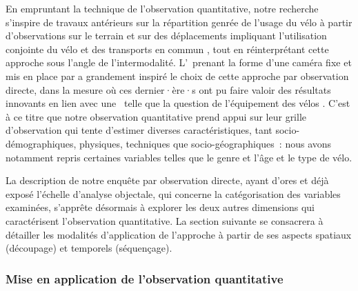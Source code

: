 \begin{refsegment}
En empruntant la technique de l’observation quantitative, notre recherche s'inspire de travaux antérieurs sur la répartition genrée de l'usage du vélo à partir d'observations sur le terrain \textcolor{blue}{\autocite[]{raibaud_femmes_2020}} et sur des déplacements impliquant l'utilisation conjointe du vélo et des transports en commun \textcolor{blue}{\autocites[192]{sherwin_practices_2011}[27]{la_paix_puello_modelling_2015}}, tout en réinterprétant cette approche sous l'angle de l'intermodalité. L'~prenant la forme d'une caméra fixe et mis en place par \textcolor{blue}{\textcite[99]{cochoy_mort_2013}} a grandement inspiré le choix de cette approche par observation directe, dans la mesure où ces dernier·ère·s ont pu faire valoir des résultats innovants en lien avec une ~telle que la question de l'équipement des vélos \textcolor{blue}{\autocite[8]{cochoy_bicycles_2019}}. C'est à ce titre que notre observation quantitative prend appui sur leur grille d'observation qui tente d'estimer diverses caractéristiques, tant socio-démographiques, physiques, techniques que socio-géographiques~: nous avons notamment repris certaines variables telles que le genre et l'âge et le type de vélo.%

La description de notre enquête par observation directe, ayant d'ores et déjà exposé l'échelle d'analyse objectale, qui concerne la catégorisation des variables examinées, s'apprête désormais à explorer les deux autres dimensions qui caractérisent l'observation quantitative. La section suivante se consacrera à détailler les modalités d'application de l'approche à partir de ses aspects spatiaux (découpage) et temporels (séquençage).%

\subsubsection*{Mise en application de l'observation quantitative
    \label{chap3:application-observation-quantitative}
    }


\end{refsegment}
